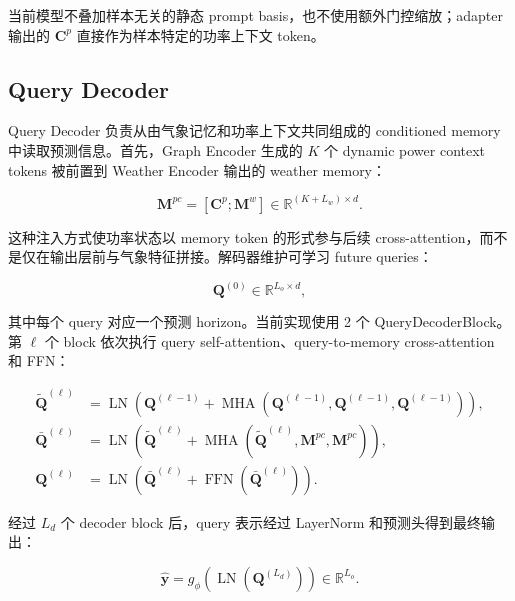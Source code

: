 当前模型不叠加样本无关的静态 prompt basis，也不使用额外门控缩放；adapter 输出的 \(\mathbf{C}^{p}\) 直接作为样本特定的功率上下文 token。


\subsection{Query Decoder}

Query Decoder 负责从由气象记忆和功率上下文共同组成的 conditioned memory 中读取预测信息。首先，Graph Encoder 生成的 \(K\) 个 dynamic power context tokens 被前置到 Weather Encoder 输出的 weather memory：

\begin{equation}
\mathbf{M}^{pc}=[\mathbf{C}^{p};\mathbf{M}^{w}]\in\mathbb{R}^{(K+L_w)\times d}.
\end{equation}

这种注入方式使功率状态以 memory token 的形式参与后续 cross-attention，而不是仅在输出层前与气象特征拼接。解码器维护可学习 future queries：

\begin{equation}
\mathbf{Q}^{(0)}\in\mathbb{R}^{L_o\times d},
\end{equation}

其中每个 query 对应一个预测 horizon。当前实现使用 2 个 QueryDecoderBlock。第 \(\ell\) 个 block 依次执行 query self-attention、query-to-memory cross-attention 和 FFN：

\begin{equation}
\begin{aligned}
\tilde{\mathbf{Q}}^{(\ell)} &= \operatorname{LN}\left(\mathbf{Q}^{(\ell-1)}+\operatorname{MHA}(\mathbf{Q}^{(\ell-1)},\mathbf{Q}^{(\ell-1)},\mathbf{Q}^{(\ell-1)})\right), \\
\bar{\mathbf{Q}}^{(\ell)} &= \operatorname{LN}\left(\tilde{\mathbf{Q}}^{(\ell)}+\operatorname{MHA}(\tilde{\mathbf{Q}}^{(\ell)},\mathbf{M}^{pc},\mathbf{M}^{pc})\right), \\
\mathbf{Q}^{(\ell)} &= \operatorname{LN}\left(\bar{\mathbf{Q}}^{(\ell)}+\operatorname{FFN}(\bar{\mathbf{Q}}^{(\ell)})\right).
\end{aligned}
\end{equation}

经过 \(L_d\) 个 decoder block 后，query 表示经过 LayerNorm 和预测头得到最终输出：

\begin{equation}
\hat{\mathbf{y}}=g_{\phi}\left(\operatorname{LN}(\mathbf{Q}^{(L_d)})\right)\in\mathbb{R}^{L_o}.
\end{equation}


